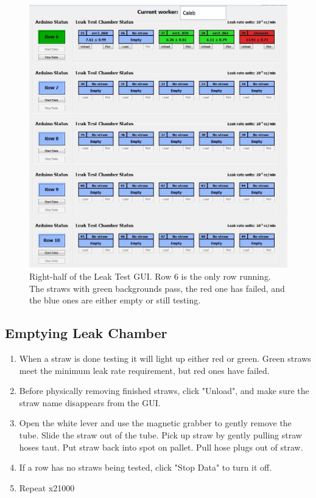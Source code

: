 \documentclass[A4,12pt]{article}
\begin{document}
\begin{figure}
	\center
	\includegraphics[scale=0.5]{GUI.JPG}
	\caption{Right-half of the Leak Test GUI.  Row 6 is the only row running.  The straws with green backgrounds pass, the red one has failed, and the blue ones are either empty or still testing.} \label{GUI}
\end{figure}






\subsection{Emptying Leak Chamber}
	\begin{enumerate}
		\item When a straw is done testing it will light up either red or green.  Green straws meet the minimum leak rate requirement, but red ones have failed.  
	\item Before physically removing finished straws, click "Unload", and make sure the straw name disappears from the GUI.  
	\item Open the white lever and use the magnetic grabber to gently remove the tube.  Slide the straw out of the tube.  Pick up straw by gently pulling straw hoses taut. Put straw back into spot on pallet.  Pull hose plugs out of straw.  
	\item If a row has no straws being tested, click "Stop Data" to turn it off.
    \item Repeat x21000
	
\end{enumerate}
\end{document}
